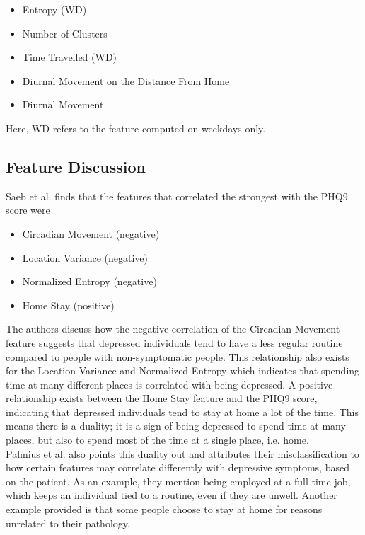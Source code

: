 \begin{itemize}
    \item Entropy (WD)
    \item Number of Clusters
    \item Time Travelled (WD)
    \item Diurnal Movement on the Distance From Home
    \item Diurnal Movement
\end{itemize}

Here, WD refers to the feature computed on weekdays only.\\

\subsection{Feature Discussion}
Saeb et al. finds that the features that correlated the strongest with the PHQ9 score were 
\begin{itemize}
    \item Circadian Movement (negative)
    \item Location Variance (negative)
    \item Normalized Entropy (negative)
    \item Home Stay (positive)
\end{itemize}

The authors discuss how the negative correlation of the Circadian Movement feature suggests that depressed individuals tend to have a less regular routine compared to people with non-symptomatic people. This relationship also exists for the Location Variance and Normalized Entropy which indicates that spending time at many different places is correlated with being depressed. A positive relationship exists between the Home Stay feature and the PHQ9 score, indicating that depressed individuals tend to stay at home a lot of the time. This means there is a duality; it is a sign of being depressed to spend time at many places, but also to spend most of the time at a single place, i.e. home.\\

Palmius et al. also points this duality out and attributes their misclassification to how certain features may correlate differently with depressive symptoms, based on the patient. As an example, they mention being employed at a full-time job, which keeps an individual tied to a routine, even if they are unwell. Another example provided is that some people choose to stay at home for reasons unrelated to their pathology. 